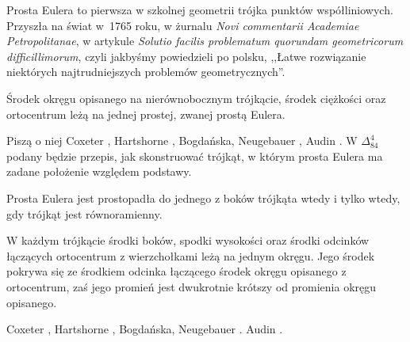%

Prosta Eulera to pierwsza w szkolnej geometrii trójka punktów współliniowych.
Przyszła na świat w~1765 roku, w żurnalu \emph{Novi commentarii Academiae Petropolitanae}, w artykule \emph{Solutio facilis problematum quorundam geometricorum difficillimorum}, czyli jakbyśmy powiedzieli po polsku, ,,Łatwe rozwiązanie niektórych najtrudniejszych problemów geometrycznych''.

\begin{proposition}
	\label{prosta_eulera}
	Środek okręgu opisanego na nierównobocznym trójkącie, środek ciężkości oraz ortocentrum leżą na jednej prostej, zwanej prostą Eulera.
\end{proposition}

Piszą o niej
Coxeter \cite[s. 32, 33]{coxeter_1967},
Hartshorne \cite[s. 54, 55]{hartshorne2000},
Bogdańska, Neugebauer \cite[s. 84]{neugebauer_2018},
Audin \cite[s. 61]{audin_2003}.
W $\Delta_{84}^{4}$ podany będzie przepis, jak skonstruować trójkąt, w którym prosta Eulera ma zadane położenie względem podstawy.

\begin{proposition}
	Prosta Eulera jest prostopadła do jednego z boków trójkąta wtedy i tylko wtedy, gdy trójkąt jest równoramienny.
\end{proposition}

\begin{proposition}
\label{okrag_dziewieciu_punktow}%
	W każdym trójkącie środki boków, spodki wysokości oraz środki odcinków łączących ortocentrum z wierzchołkami leżą na jednym okręgu.
	Jego środek pokrywa się ze środkiem odcinka łączącego środek okręgu opisanego z ortocentrum, zaś jego promień jest dwukrotnie krótszy od promienia okręgu opisanego.
\end{proposition}


Coxeter \cite[s. 34, 35, 88]{coxeter_1967}, Hartshorne \cite[s. 57, 60]{hartshorne2000}, Bogdańska, Neugebauer \cite[s. 85, 86]{neugebauer_2018}.
Audin \cite[s. 62]{audin_2003}.

